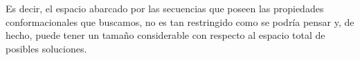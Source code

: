 Es decir, el espacio abarcado por las secuencias que poseen las propiedades conformacionales que buscamos, no es tan restringido como se podría pensar y, de hecho,
puede tener un tamaño considerable con respecto al espacio total de posibles soluciones.
% 


% 

